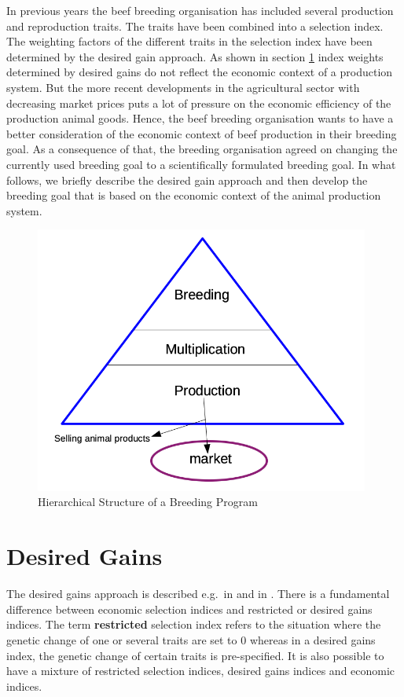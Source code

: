\documentclass[
]{book}
\begin{document}
In previous years the beef breeding organisation has included several production and reproduction traits. The traits have been combined into a selection index. The weighting factors of the different traits in the selection index have been determined by the desired gain approach. As shown in section \ref{gel-implbp-desired-gains} index weights determined by desired gains do not reflect the economic context of a production system. But the more recent developments in the agricultural sector with decreasing market prices puts a lot of pressure on the economic efficiency of the production animal goods. Hence, the beef breeding organisation wants to have a better consideration of the economic context of beef production in their breeding goal. As a consequence of that, the breeding organisation agreed on changing the currently used breeding goal to a scientifically formulated breeding goal. In what follows, we briefly describe the desired gain approach and then develop the breeding goal that is based on the economic context of the animal production system.

\begin{figure}[H]
\includegraphics[width=11cm]{odg/gel-implbp-hier-bp} \caption{Hierarchical Structure of a Breeding Program}\label{fig:gel-implbp-hier-bp}
\end{figure}

\hypertarget{gel-implbp-desired-gains}{%
\section{Desired Gains}\label{gel-implbp-desired-gains}}

The desired gains approach is described e.g.~in \citep{Brascamp1984} and in \citep{Gibson1990}. There is a fundamental difference between economic selection indices and restricted or desired gains indices. The term \textbf{restricted} selection index refers to the situation where the genetic change of one or several traits are set to \(0\) whereas in a desired gains index, the genetic change of certain traits is pre-specified. It is also possible to have a mixture of restricted selection indices, desired gains indices and economic indices.
\end{document}
